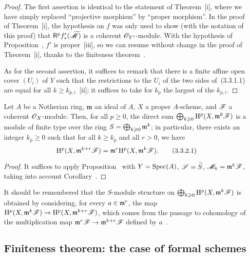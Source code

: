 \begin{proof}
\label{proof-3.3.3.1}
The first assertion is identical to the statement of Theorem~[i], where we have simply replaced ``projective morphism'' by ``proper morphism''.
In the proof of Theorem~[i], the hypothesis on $f$ was only used to show (with the notation of this proof) that $\mathsf{R}^p f_*'({\widetilde{\mathscr{M}}})$ is a coherent $\mathscr{O}_{Y'}$-module.
With the hypothesis of Proposition~, $f'$ is proper~[iii], so we can resume without change in the proof of Theorem~[i], thanks to the finiteness theorem~.

As for the second assertion, it suffices to remark that there is a finite affine open cover $(U_i)$ of $Y$ such that the restrictions to the $U_i$ of the two sides of~(3.3.1.1) are equal for all $k\geq k_{p,i}$~[ii]; it suffices to take for $k_p$ the largest of the $k_{p,i}$.
\end{proof}

\begin{cor}[3.3.2]
\label{3.3.3.2}
Let $A$ be a Notherian ring, $\mathfrak{m}$ an ideal of $A$, $X$ a proper $A$-scheme, and $\mathscr{F}$ a coherent $\mathscr{O}_X$-module.
Then, for all $p\geq 0$, the direct sum $\bigoplus_{k\geqslant 0}\mathrm{H}^p(X,\mathfrak{m}^k\mathscr{F})$ is a module of finite type over the ring $S=\bigoplus_{k\geqslant 0}\mathfrak{m}^k$; in particular, there exists an integer $k_p\geq 0$ such that for all $k\geq k_p$ and all $r>0$, we have
\[
\label{3.3.3.2.1}
  \mathrm{H}^p(X,\mathfrak{m}^{k+r}\mathscr{F})=\mathfrak{m}^r\mathrm{H}^p(X,\mathfrak{m}^k\mathscr{F}).
  \tag{3.3.2.1}
\]
\end{cor}

\begin{proof}
\label{proof-3.3.3.2}
It suffices to apply Proposition~ with $Y={\mathop{\mathrm{Spec}}\nolimits}(A)$, $\mathscr{S}={\widetilde{S}}$, $\mathscr{M}_k=\mathfrak{m}^k\mathscr{F}$, taking into account Corollary~.
\end{proof}

It should be remembered that the $S$-module structure on $\bigoplus_{k\geqslant 0}\mathrm{H}^p(X,\mathfrak{m}^k\mathscr{F})$ is obtained by considering, for every $a\in\mathfrak{m}^r$, the map $\HH^p(X,\fk{m}^k\sh{F})\to\HH^p(X,\fk{m}^{k+r}\sh{F})$, which comes from the passage to cohomology of the multiplication map $\fk{m}^r\sh{F}\to\fk{m}^{k+r}\sh{F}$ defined by $a$~.

\subsection{Finiteness theorem: the case of formal schemes}
\label{subsection:finiteness-theorem-formal-case}

